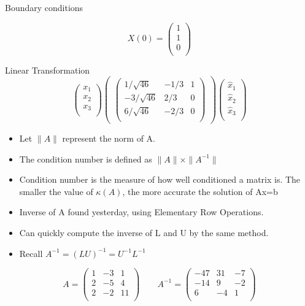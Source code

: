 \documentclass[12pt, a4paper]{report}
\begin{document}
{{Boundary conditions

\[ X(0) = \left( \begin{array}{c}
    1 \\
    1 \\
    0 \\
  \end{array}
\right)\]

Linear Transformation
\[ \left(
  \begin{array}{c}
    x_1 \\
    x_2 \\
    x_3 \\
  \end{array}
\right)\left(
\begin{array}{ccc}
\left(\begin{array}{ccc}
1/ \sqrt{46} & -1/3 & 1 \\
-3/ \sqrt{46} & 2/3 & 0 \\
6/ \sqrt{46} & -2/3 & 0 \\
\end{array} \right)
 \end{array}
       \right)
        \left( \begin{array}{c}
    \hat{x}_1 \\
    \hat{x}_2 \\
    \hat{x}_3 \\
  \end{array}
\right)\]


}
\newpage

{\Large
\begin{itemize}
\item Let $\|A\|$ represent the norm of A.
\item The condition number is defined as $\|A\| \times \|A^{-1}\| $ 
\item Condition number is the measure of how well  conditioned a matrix is. The smaller the value of $\kappa(A)$, the more accurate the solution of Ax=b
\item Inverse of A found yesterday, using Elementary Row Operations.
\item Can quickly compute the inverse of L and U by the same method.
\item Recall $A^{-1} = (LU)^{-1} = U^{-1}L^{-1}$
\end{itemize}


\[A = \left(\begin{array}{ccc}
1&-3&1\\
2&-5&4\\
2&-2&11\\
\end{array}\right) \qquad A^{-1}=\left(\begin{array}{ccc}
-47	&	31	&	-7	\\
-14	&	9	&	-2	\\
6	&	-4	&	1	\\
\end{array}\right)\]

}}
\end{document}
